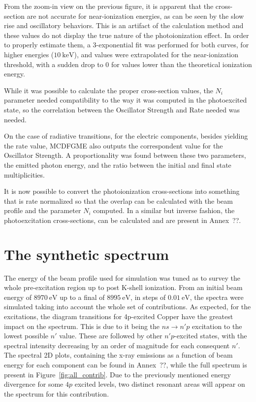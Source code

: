
From the zoom-in view on the previous figure, it is apparent that the cross-section are not accurate for near-ionization energies, as can be seen by the slow rise and oscillatory behaviors. This is an artifact of the calculation method and these values do not display the true nature of the photoionization effect. In order to properly estimate them, a 3-exponential fit was performed for both curves, for higher energies ($10\ \si{\kilo\electronvolt}$), and values were extrapolated for the near-ionization threshold, with a sudden drop to 0 for values lower than the theoretical ionization energy.


While it was possible to calculate the proper cross-section values, the $N_i$ parameter needed compatibility to the way it was computed in the photoexcited state, so the correlation between the Oscillator Strength and Rate needed was needed.


On the case of radiative transitions, for the electric components, besides yielding the rate value, \gls{MCDFGME} also outputs the correspondent value for the Oscillator Strength. A proportionality was found between these two parameters, the emitted photon energy, and the ratio between the initial and final state multiplicities.


It is now possible to convert the photoionization cross-sections into something that is rate normalized so that the overlap can be calculated with the beam profile and the parameter $N_i$ computed. In a similar but inverse fashion, the photoexcitation cross-sections, can be calculated and are present in Annex~??.


\section{The synthetic spectrum}

The energy of the beam profile used for simulation was tuned as to survey the whole pre-excitation region up to post K-shell ionization. From an initial beam energy of $8970\ \si{\electronvolt}$ up to a final of $8995\ \si{\electronvolt}$, in steps of $0.01\ \si{\electronvolt}$, the spectra were simulated taking into account the whole set of contributions. As expected, for the excitations, the diagram transitions for 4p-excited Copper have the greatest impact on the spectrum. This is due to it being the $ns\rightarrow n' p$ excitation to the lowest possible $n'$ value. These are followed by other $n'p$-excited states, with the spectral intensity decreasing by an order of magnitude for each consequent $n'$. The spectral 2D plots, containing the x-ray emissions as a function of beam energy for each component can be found in Annex~??, while the full spectrum is present in Figure~\ref{fig:all_contrib}. Due to the previously mentioned energy divergence for some $4p$ excited levels, two distinct resonant areas will appear on the spectrum for this contribution.

